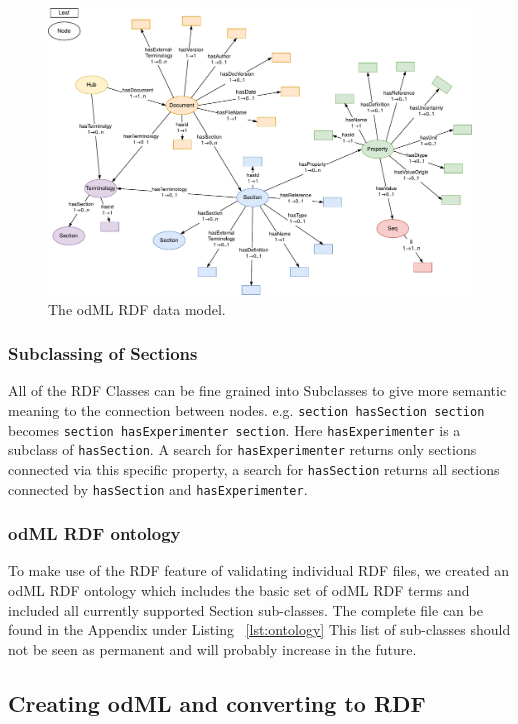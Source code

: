 \documentclass{article}
\begin{document}
\begin{figure}
\begin{center}
\includegraphics[width=0.90\columnwidth]{figures/odmlRDFDataModel.pdf}
\caption{The odML RDF data model.}
\label{fig:rdfModel}
\end{center}
\end{figure}

\subsubsection{Subclassing of Sections} \label{sec:rdf_subclassing}
All of the RDF Classes can be fine grained into Subclasses to give more semantic meaning to the connection between nodes. e.g. \texttt{section hasSection section} becomes \texttt{section hasExperimenter section}. Here \texttt{hasExperimenter} is a subclass of \texttt{hasSection}. A search for \texttt{hasExperimenter} returns only sections connected via this specific property, a search for \texttt{hasSection} returns all sections connected by \texttt{hasSection} and \texttt{hasExperimenter}.

\subsubsection{odML RDF ontology} \label{sec:odml_ontology}
To make use of the RDF feature of validating individual RDF files, we created an odML RDF ontology which includes the basic set of odML RDF terms and included all currently supported Section sub-classes. The complete file can be found in the Appendix under Listing ~\ref{lst:ontology} This list of sub-classes should not be seen as permanent and will probably increase in the future.

\subsection{Creating odML and converting to RDF} \label{sec:odml_to_rdf}
\end{document}
